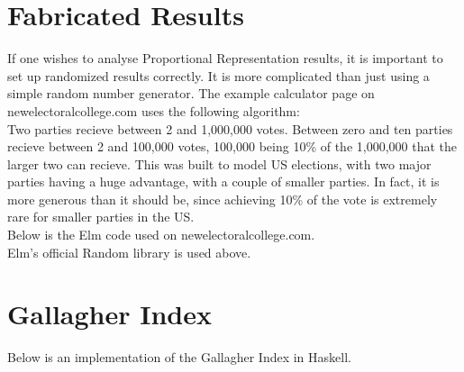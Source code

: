 \documentclass{article}
\begin{document}
    \section{Fabricated Results}

    If one wishes to analyse Proportional Representation results, it is important to set up randomized results correctly. It is more complicated than just using a simple random number generator. The example calculator page on newelectoralcollege.com uses the following algorithm: \\

    Two parties recieve between 2 and 1,000,000 votes. Between zero and ten parties recieve between 2 and 100,000 votes, 100,000 being 10\% of the 1,000,000 that the larger two can recieve. This was built to model US elections, with two major parties having a huge advantage, with a couple of smaller parties. In fact, it is more generous than it should be, since achieving 10\% of the vote is extremely rare for smaller parties in the US. \\

    Below is the Elm code used on newelectoralcollege.com. \\

    

    Elm's official Random library is used above.

    \section{Gallagher Index}

    Below is an implementation of the Gallagher Index in Haskell.

    
\end{document}
